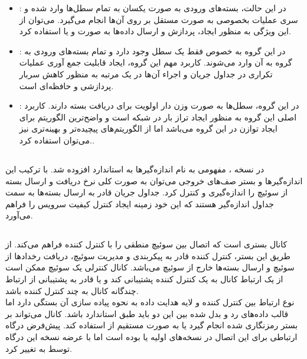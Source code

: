 \begin{itemize}
	\item {}:
در این حالت، بسته‌های ورودی به صورت یکسان به تمام سطل‌ها وارد شده و سری عملیات بخصوصی به صورت مستقل بر روی آن‌ها انجام می‌گیرد. می‌توان از این ویژگی به منظور ایجاد، پردازش و ارسال داده‌ها به صورت  و یا  استفاده کرد.
	\item {}:
در این گروه به خصوص فقط یک سطل وجود دارد و تمام بسته‌های ورودی به گروه به آن وارد می‌شوند. کاربرد مهم این گروه، ایجاد قابلیت جمع آوری عملیات تکراری در جداول جریان و اجراء آن‌ها در یک مرتبه به منظور کاهش سربار پردازشی و حافظه‌ای است.
	\item {}:
در این گروه، سطل‌ها به صورت وزن دار اولویت برای دریافت بسته دارند. کاربرد اصلی این گروه به منظور ایجاد تراز بار در شبکه است و واضح‌ترین الگوریتم برای ایجاد توازن در این گروه  می‌باشد اما از الگوریتم‌های پیچیده‌تر و بهینه‌تری نیز می‌توان استفاده کرد..
\end{itemize}

\subsection{}
در نسخه ، مفهومی به نام اندازه‌گیر‌ها به استاندارد  افزوده شد. با ترکیب این اندازه‌گیر‌ها و بستر صف‌های خروجی می‌توان به صورت کلی نرخ دریافت و ارسال بسته از سوئیچ را اندازه‌گیری و کنترل کرد. جداول جریان قادر به ارسال بسته‌ها به سمت جداول اندازه‌گیر هستند که این خود زمینه ایجاد کنترل کیفیت سرویس را فراهم می‌آورد.

\subsection{}
کانال  بستری است که اتصال بین سوئیچ منطقی را با کنترل کننده فراهم می‌کند. از طریق این بستر، کنترل کننده قادر به پیکربندی و مدیریت سوئیچ، دریافت رخداد‌ها از سوئیچ و ارسال بسته‌ها خارج از سوئیچ می‌باشد. کانال کنترلی یک سوئیچ ممکن است از یک ارتباط کانال  به یک کنترل کننده پشتیبانی کند و یا قادر به پشتیبانی از ارتباط چندگانه کانال  به چند کنترل کننده باشد.\\
نوع ارتباط بین کنترل کننده و لایه هدایت داده به نحوه پیاده سازی آن بستگی دارد اما قالب داده‌های رد و بدل شده بین این دو باید طبق استاندارد  باشد. کانال  می‌تواند بر بستر رمزنگاری شده  انجام گیرد یا به صورت مستقیم از  استفاده کند. پیش‌فرض درگاه ارتباطی برای این اتصال در نسخه‌های اولیه  یا  بوده است اما با عرضه نسخه  این درگاه توسط  به  تغییر کرد.

